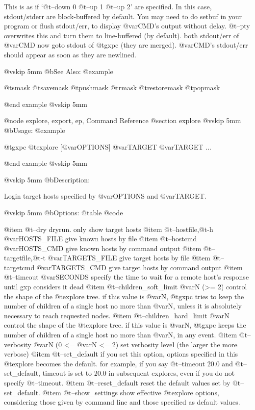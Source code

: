 This is as if `@t{--down} 0 @t{--up} 1 @t{--up} 2' are specified.  In this
case, stdout/stderr are block-buffered by default.  You may need
to do setbuf in your program or flush stdout/err, to display
@var{CMD}'s output without delay.  @t{--pty} overwrites this and turn them
to line-buffered (by default).  both stdout/err of @var{CMD} now goto
stdout of @t{gxpc} (they are merged).  @var{CMD}'s stdout/err should appear
as soon as they are newlined.

@vskip 5mm
@b{See Also:}
@example

  @t{smask} @t{savemask} @t{pushmask} @t{rmask} @t{restoremask} @t{popmask}

@end example
@vskip 5mm

@node explore, export, ep, Command Reference
@section explore
@vskip 5mm
@b{Usage:}
@example

  @t{gxpc} @t{explore} [@var{OPTIONS}] @var{TARGET} @var{TARGET} ...

@end example
@vskip 5mm

@vskip 5mm
@b{Description:}


  Login target hosts specified by @var{OPTIONS} and @var{TARGET}.

@vskip 5mm
@b{Options:}
@table @code

@item   @t{--dry}
    dryrun. only show target hosts
@item   @t{--hostfile},@t{-h} @var{HOSTS_FILE}
    give known hosts by file
@item   @t{--hostcmd} @var{HOSTS_CMD}
    give known hosts by command output
@item   @t{--targetfile},@t{-t} @var{TARGETS_FILE}
    give target hosts by file
@item   @t{--targetcmd} @var{TARGETS_CMD}
    give target hosts by command output
@item   @t{--timeout} @var{SECONDS}
    specify the time to wait for a remote host's response
    until gxp considers it dead
@item   @t{--children_soft_limit} @var{N} (>= 2)
    control the shape of the @t{explore} tree. if this value is @var{N}, @t{gxpc}
    tries to keep the number of children of a single host no more than @var{N},
    unless it is absolutely necessary to reach requested nodes.
@item   @t{--children_hard_limit} @var{N}
    control the shape of the @t{explore} tree. if this value is @var{N}, @t{gxpc}
    keeps the number of children of a single host no more than @var{N}, in any event.
@item   @t{--verbosity} @var{N} (0 <= @var{N} <= 2)
    set verbosity level (the larger the more verbose)
@item   @t{--set_default}
    if you set this option, options specified in this @t{explore} becomes the default.
    for example, if you say @t{--timeout} 20.0 and @t{--set_default}, timeout is set to
    20.0 in subsequent explores, even if you do not specify @t{--timeout}.
@item   @t{--reset_default}
    reset the default values set by @t{--set_default}.
@item   @t{--show_settings}
    show effective @t{explore} options, considering those given by command line and
    those specified as default values.

